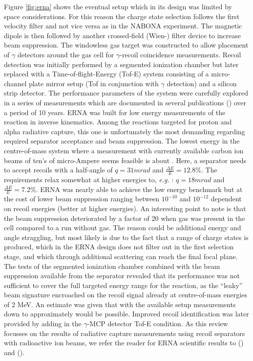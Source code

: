 Figure \ref{fig:erna} shows the eventual setup which in its design was limited by space considerations. For this reason the charge state selection follows the first velocity filter and not vice versa as in the NABONA experiment. The magnetic dipole is then followed by another crossed-field (Wien-) filter device to increase beam suppression. The windowless gas target was constructed to allow placement of $\gamma$ detectors around the gas cell for $\gamma$-recoil coincidence measurements. Recoil detection was initially performed by a segmented ionization chamber but later replaced with a Time-of-flight-Energy (Tof-E) system consisting of a micro-channel plate mirror setup (Tof in conjunction with $\gamma$ detection) and a silicon strip detector. The performance parameters of the system were carefully explored in a series of measurements which are documented in several publications (\cite{roga99,roga03,gial04,schu04,dile08}) over a period of 10 years. ERNA was built for low energy measurements of the \reac{\alpha}{\gamma} reaction in inverse kinematics. Among the reactions targeted for proton and alpha radiative capture, this one is unfortunately the most demanding regarding required separator acceptance and beam suppression. The lowest energy in the centre-of-mass system where a measurement with currently available carbon ion beams of ten's of micro-Ampere seems feasible is about . Here, a separator needs to accept recoils with a half-angle of $q = 31 \unit{mrad}$ and $\frac{\Delta{}E}{E} = 12.8\%$. The requirements relax somewhat at higher energies to, {\it e.g.} : $q = 18 \unit{mrad}$ and $\frac{\Delta{}E}{E} = 7.2\%$. ERNA was nearly able to achieve the low energy benchmark but at the cost of lower beam suppression ranging between $10^{-10}$ and $10^{-12}$ dependent on recoil energies (better at higher energies). An interesting point to note is that the beam suppression deteriorated by a factor of 20 when gas was present in the cell compared to a run without gas. The reason could be additional energy and angle straggling, but most likely is due to the fact that a range of charge states is produced, which in the ERNA design does not filter out in the first selection stage, and which through additional scattering can reach the final focal plane. The tests of the segmented ionization chamber combined with the beam suppression available from the separator revealed that its performance was not sufficient to cover the full targeted energy range for the \reac{\alpha}{\gamma} reaction, as the ``leaky'' beam signature encroached on the  recoil signal already at centre-of-mass energies of 2 MeV. An estimate was given that with the available setup measurements down to approximately  would be possible. Improved recoil identification was later provided by adding in the $\gamma$-MCP detector Tof-E condition. As this review focusses on the results of radiative capture measurements using recoil separators with radioactive ion beams, we refer the reader for ERNA scientific results to \cite{schu05,schu05b} (\reac{\alpha}{\gamma}) and \cite{dile09} (\reac{\alpha}{\gamma}).
